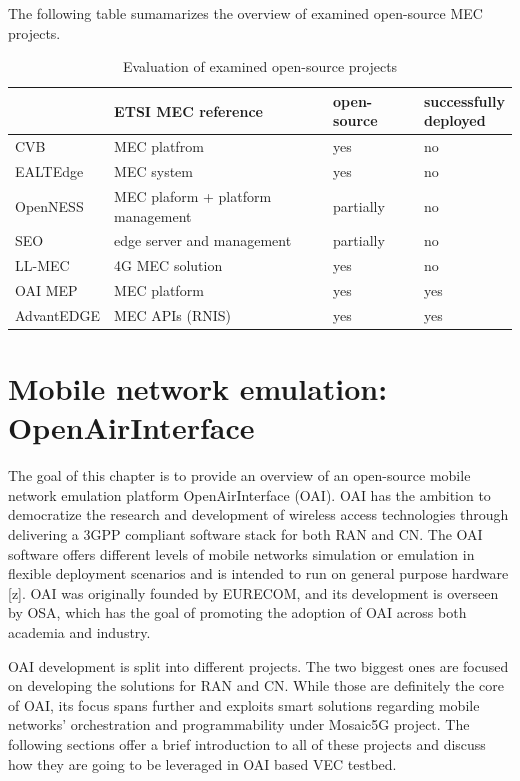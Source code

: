 \documentclass[12pt,a4paper,twoside]{report}
\begin{document}
The following table sumamarizes the overview of examined open-source MEC projects.
\begin{table}[!ht]
    \centering
	\caption{Evaluation of examined open-source projects}
    \begin{tabular}{|l|l|l|l|}
    \hline
        & ETSI MEC reference & open-source & \Longunderstack{successfully\\deployed} \\ \hline
        CVB & MEC platfrom & yes & no \\ \hline
        EALTEdge & MEC system & yes & no \\ \hline
        OpenNESS & MEC plaform + platform management & partially & no \\ \hline
        SEO & edge server and management & partially & no \\ \hline
        LL-MEC & 4G MEC solution & yes & no \\ \hline
        OAI MEP & MEC platform & yes & yes \\ \hline
        AdvantEDGE & MEC APIs (RNIS) & yes & yes \\ \hline
    \end{tabular}
\end{table}
\chapter{Mobile network emulation: \texorpdfstring{\\ \mbox{OpenAirInterface}}{OpenAirInterface}}
The goal of this chapter is to provide an overview of an open-source mobile network emulation platform OpenAirInterface (OAI). OAI has the ambition to democratize the research and development of wireless access technologies through delivering a 3GPP compliant software stack for both RAN and CN. The OAI software offers different levels of mobile networks simulation or emulation in flexible deployment scenarios and is intended to run on general purpose hardware [z]. OAI was originally founded by EURECOM, and its development is overseen by OSA, which has the goal of promoting the adoption of OAI across both academia and industry. 

OAI development is split into different projects. The two biggest ones are focused on developing the solutions for RAN and CN. While those are definitely the core of OAI, its focus spans further and exploits smart solutions regarding mobile networks’ orchestration and programmability under Mosaic5G project. The following sections offer a brief introduction to all of these projects and discuss how they are going to be leveraged in OAI based VEC testbed.
\end{document}
